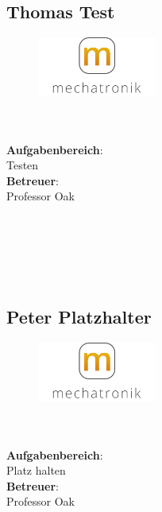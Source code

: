\subsection*{Thomas Test}
\begin{figure}
\begin{center}
  \includegraphics[width=0.35\textwidth]{fig/logoMecha}
\end{center}
\end{figure}
\mbox{}\\
\mbox{}\\
\textbf{Aufgabenbereich}:\\
Testen\\
\textbf{Betreuer}:\\
Professor Oak
\mbox{}\\
\mbox{}\\
\mbox{}\\
\mbox{}\\
\mbox{}\\
\mbox{}\\

\subsection*{Peter Platzhalter}
\begin{figure}
\begin{center}
  \includegraphics[width=0.35\textwidth]{fig/logoMecha}
\end{center}
\end{figure}
\mbox{}\\
\mbox{}\\
\textbf{Aufgabenbereich}:\\
Platz halten\\
\textbf{Betreuer}:\\
Professor Oak
\mbox{}\\
\mbox{}\\
\mbox{}\\
\mbox{}\\
\mbox{}\\
\newpage